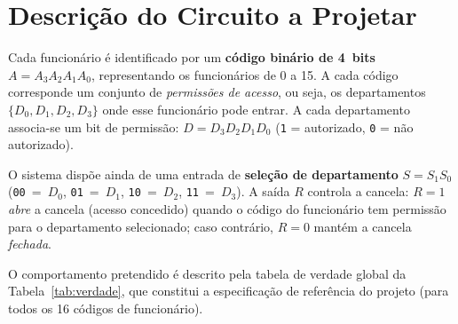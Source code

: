 \documentclass[12pt]{article}
\begin{document}
\section{Descrição do Circuito a Projetar}
Cada funcionário é identificado por um \textbf{código binário de 4~bits}
$A = A_3A_2A_1A_0$, representando os funcionários de 0 a 15. A cada código
corresponde um conjunto de \emph{permissões de acesso}, ou seja, os
departamentos $\{D_0, D_1, D_2, D_3\}$ onde esse funcionário pode entrar. A
cada departamento associa-se um bit de permissão:
$D = D_3D_2D_1D_0$ (\texttt{1} = autorizado, \texttt{0} = não autorizado).

O sistema dispõe ainda de uma entrada de \textbf{seleção de departamento}
$S = S_1S_0$ (\texttt{00}~=~$D_0$, \texttt{01}~=~$D_1$, \texttt{10}~=~$D_2$,
\texttt{11}~=~$D_3$). A saída $R$ controla a cancela: $R=1$ \emph{abre} a
cancela (acesso concedido) quando o código do funcionário tem permissão para o
departamento selecionado; caso contrário, $R=0$ mantém a cancela \emph{fechada}.

O comportamento pretendido é descrito pela tabela de verdade global da
Tabela~\ref{tab:verdade}, que constitui a especificação de referência do
projeto (para todos os 16 códigos de funcionário).
\end{document}
